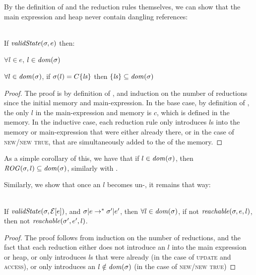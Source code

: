 	\LS
	By the definition of \VS and the reduction rules themselves, we can show that the main expression and heap never contain dangling references:
	\SS\begin{Lemma}[No Dangling]\ \\
		\indent If $\mathit{validState}(\sigma, e)$ then:
		\begin{iitemize}
			\item $\forall l \in e$, $l \in \mathit{dom}(\sigma)$\SS
			\item $\forall l \in \mathit{dom}(\sigma)$, if $\sigma(l) = C\{\mathit{ls}\}$ then $\{\mathit{ls}\} \subseteq \mathit{dom}(\sigma)$
		\end{iitemize}
	\end{Lemma}\SS
	\begin{proof}
		The proof is by definition of \VS, and induction on the number of reductions since the initial memory and main-expression.
		In the base case, by definition of \VS, the only $l$ in the main-expression and memory is $c$, which is defined in the memory.
		In the inductive case, each reduction rule only introduces $l$s into the memory or main-expression that were either already there, or in the case of \textsc{new/new true}, that are simultaneously added to the \dom of the memory.
	\end{proof}
	\noindent As a simple corollary of this, we have that if $l \in \mathit{dom}(\sigma)$, then $\mathit{ROG}(\sigma, l) \subseteq \mathit{dom}(\sigma)$, similarly with \mrog.

	\LS
	Similarly, we show that once an $l$ becomes un-\reach, it remains that way:
	\SS\begin{Lemma}\ \\
		\indent If $\mathit{validState}(\sigma, \mathcal{E}[e])$, and $\sigma|e \rightarrow^* \sigma'|e'$, then $\forall l \in \mathit{dom}(\sigma)$, if not $\mathit{reachable}(\sigma, e, l)$, then not $\mathit{reachable}(\sigma', e', l)$.
	\end{Lemma}\SS
	\begin{proof}
		The proof follows from induction on the number of reductions, and the fact that each reduction either does not introduce an $l$ into the main expression or heap,
		or only introduces $l$s that were already \reach (in the case of \textsc{update} and \textsc{access}), or only introduces an $l \notin \mathit{dom}(\sigma)$ (in the case of \textsc{new/new true})
	\end{proof}
	
